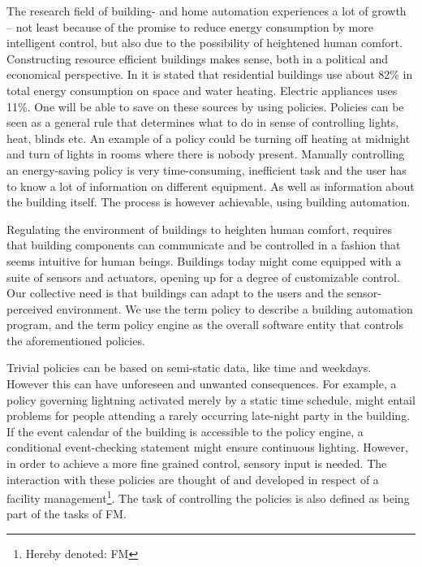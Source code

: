 The research field of building- and home automation experiences a lot of growth -- not least because of the promise to reduce energy consumption by more intelligent control, but also due to the possibility of heightened human comfort. Constructing resource efficient buildings makes sense, both in a political and economical perspective. In \cite{janssen2004towards} it is stated that residential buildings use about 82\% in total energy consumption on space and water heating. Electric appliances uses 11\%. One will be able to save on these sources by using policies. Policies can be seen as a general rule that determines what to do in sense of controlling lights, heat, blinds etc. An example of a policy could be turning off heating at midnight and turn of lights in rooms where there is nobody present. 
Manually controlling an energy-saving policy is very time-consuming, inefficient task and the user has to know a lot of information on different equipment. As well as information about the building itself. The process is however achievable,  using building automation. 

Regulating the environment of buildings to heighten human comfort, requires that building components can communicate and be controlled in a fashion that seems intuitive for human beings. Buildings today might come equipped with a suite of sensors and actuators, opening up for a degree of customizable control. Our collective need is that buildings can adapt to the users and the sensor-perceived environment. We use the term policy to describe a building automation program, and the term policy engine as the overall software entity that controls the aforementioned policies.

Trivial policies can be based on semi-static data, like time and weekdays. However this can have unforeseen and unwanted consequences. For example, a policy governing lightning activated merely by a static time schedule, might entail problems for people attending a rarely occurring late-night party in the building. If the event calendar of the building is accessible to the policy engine, a conditional event-checking statement might ensure continuous lighting. However, in order to achieve a more fine grained control, sensory input is needed. The interaction with these policies are thought of and developed in respect of a facility management\footnote{Hereby denoted: FM}. The task of controlling the policies is also defined as being part of the tasks of FM.

